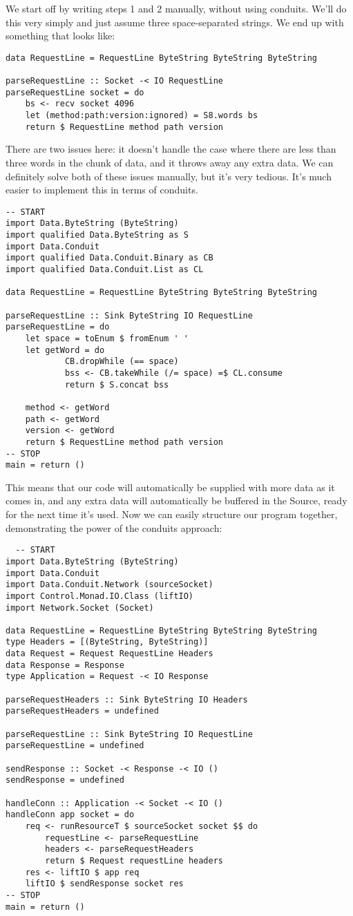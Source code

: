 We start off by writing steps 1 and 2 manually, without using conduits. We'll do this very
simply and just assume three space-separated strings. We end up with something that looks
like:
\begin{lstlisting}
data RequestLine = RequestLine ByteString ByteString ByteString

parseRequestLine :: Socket -< IO RequestLine
parseRequestLine socket = do
    bs <- recv socket 4096
    let (method:path:version:ignored) = S8.words bs
    return $ RequestLine method path version
\end{lstlisting}
There are two issues here: it doesn't handle the case where there are less than three
words in
the chunk of data, and it throws away any extra data. We can definitely solve both of
these
issues manually, but it's very tedious. It's much easier to implement this in terms of
conduits.
\begin{lstlisting}
-- START
import Data.ByteString (ByteString)
import qualified Data.ByteString as S
import Data.Conduit
import qualified Data.Conduit.Binary as CB
import qualified Data.Conduit.List as CL

data RequestLine = RequestLine ByteString ByteString ByteString

parseRequestLine :: Sink ByteString IO RequestLine
parseRequestLine = do
    let space = toEnum $ fromEnum ' '
    let getWord = do
            CB.dropWhile (== space)
            bss <- CB.takeWhile (/= space) =$ CL.consume
            return $ S.concat bss

    method <- getWord
    path <- getWord
    version <- getWord
    return $ RequestLine method path version
-- STOP
main = return ()
\end{lstlisting}
This means that our code will automatically be supplied with more data as it comes in, and
any
extra data will automatically be buffered in the Source, ready for the next time
it's used. Now we can easily structure our program together, demonstrating the power of
the
conduits approach:
\begin{lstlisting}
  -- START
import Data.ByteString (ByteString)
import Data.Conduit
import Data.Conduit.Network (sourceSocket)
import Control.Monad.IO.Class (liftIO)
import Network.Socket (Socket)

data RequestLine = RequestLine ByteString ByteString ByteString
type Headers = [(ByteString, ByteString)]
data Request = Request RequestLine Headers
data Response = Response
type Application = Request -< IO Response

parseRequestHeaders :: Sink ByteString IO Headers
parseRequestHeaders = undefined

parseRequestLine :: Sink ByteString IO RequestLine
parseRequestLine = undefined

sendResponse :: Socket -< Response -< IO ()
sendResponse = undefined

handleConn :: Application -< Socket -< IO ()
handleConn app socket = do
    req <- runResourceT $ sourceSocket socket $$ do
        requestLine <- parseRequestLine
        headers <- parseRequestHeaders
        return $ Request requestLine headers
    res <- liftIO $ app req
    liftIO $ sendResponse socket res
-- STOP
main = return ()
\end{lstlisting}
